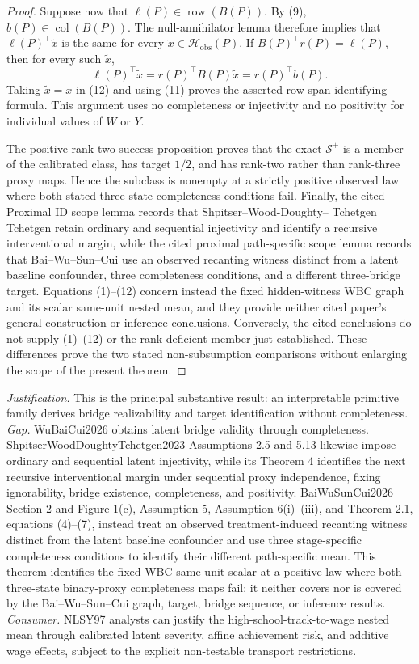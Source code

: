 \documentclass{article}
\begin{document}
\begin{proof}
Suppose now that \(\ell(P)\in\operatorname{row}(B(P))\).  By (9),
\(b(P)\in\operatorname{col}(B(P))\).  The null-annihilator lemma therefore implies
that \(\ell(P)^\top\widetilde x\) is the same for every
\(\widetilde x\in\mathcal H_{\mathrm{obs}}(P)\).  If
\(B(P)^\top r(P)=\ell(P)\), then for every such \(\widetilde x\),
\[
 \ell(P)^\top\widetilde x
 =r(P)^\top B(P)\widetilde x
 =r(P)^\top b(P).
 \tag{12}
\]
Taking \(\widetilde x=x\) in (12) and using (11) proves the asserted row-span
identifying formula.  This argument uses no completeness or injectivity and no
positivity for individual values of \(W\) or \(Y\).

The positive-rank-two-success proposition proves that the exact
\(\mathcal S^+\) is a member of the calibrated class, has target \(1/2\), and has
rank-two rather than rank-three proxy maps.  Hence the subclass is nonempty at a
strictly positive observed law where both stated three-state completeness conditions
fail.  Finally, the cited Proximal ID scope lemma records that Shpitser--Wood-Doughty--
Tchetgen Tchetgen retain ordinary and sequential injectivity and identify a recursive
interventional margin, while the cited proximal path-specific scope lemma records that
Bai--Wu--Sun--Cui use an observed recanting witness distinct from a latent baseline
confounder, three completeness conditions, and a different three-bridge target.
Equations (1)--(12) concern instead the fixed hidden-witness WBC graph and its scalar
same-unit nested mean, and they provide neither cited paper's general construction or
inference conclusions.  Conversely, the cited conclusions do not supply (1)--(12) or
the rank-deficient member just established.  These differences prove the two stated
non-subsumption comparisons without enlarging the scope of the present theorem.
\end{proof}
\par\smallskip\noindent \textit{Justification.} This is the principal substantive result: an interpretable primitive family derives bridge realizability and target identification without completeness. \textit{Gap.} WuBaiCui2026 obtains latent bridge validity through completeness. ShpitserWoodDoughtyTchetgen2023 Assumptions 2.5 and 5.13 likewise impose ordinary and sequential latent injectivity, while its Theorem 4 identifies the next recursive interventional margin under sequential proxy independence, fixing ignorability, bridge existence, completeness, and positivity. BaiWuSunCui2026 Section 2 and Figure 1(c), Assumption 5, Assumption 6(i)--(iii), and Theorem 2.1, equations (4)--(7), instead treat an observed treatment-induced recanting witness distinct from the latent baseline confounder and use three stage-specific completeness conditions to identify their different path-specific mean. This theorem identifies the fixed WBC same-unit scalar at a positive law where both three-state binary-proxy completeness maps fail; it neither covers nor is covered by the Bai--Wu--Sun--Cui graph, target, bridge sequence, or inference results. \textit{Consumer.} NLSY97 analysts can justify the high-school-track-to-wage nested mean through calibrated latent severity, affine achievement risk, and additive wage effects, subject to the explicit non-testable transport restrictions.
\end{document}
